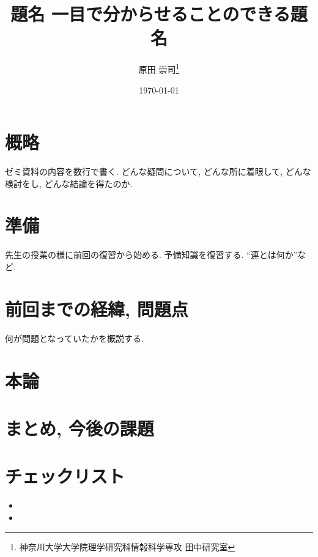 \documentclass[10pt,twocolumn]{jarticle}
\title{題名 一目で分からせることのできる題名}
\author{原田 崇司\if0\thanks{神奈川大学大学院理学研究科情報科学専攻 田中研究室}\fi}
\date{\today}
\begin{document}
\maketitle
\thispagestyle{empty}

%
%
%
%
%
%

\section{概略}
\noindent ゼミ資料の内容を数行で書く. どんな疑問について, どんな所に着眼して, どんな検討をし, どんな結論を得たのか.

\section{準備}
\noindent 先生の授業の様に前回の復習から始める. 予備知識を復習する. ``連とは何か''など.

\section{前回までの経緯, 問題点}
\noindent 何が問題となっていたかを概説する.

\section{本論}


\section{まとめ, 今後の課題}

{\small


}

\section{チェックリスト}
\begin{itemize}
\item 
\item 
\end{itemize}
\end{document}
